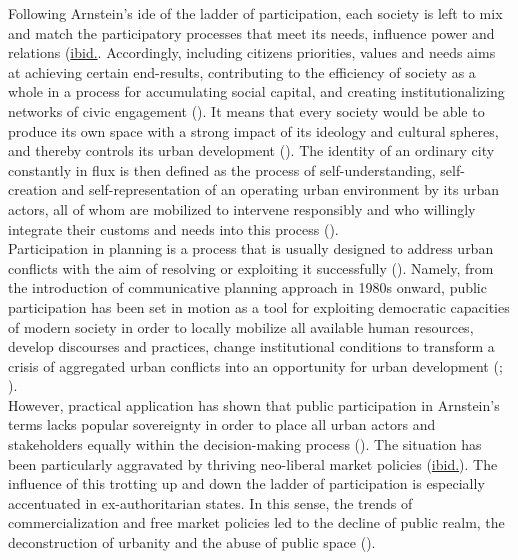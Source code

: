 \documentclass[11pt]{report}
\begin{document}
Following Arnstein’s ide of the ladder of participation, each society is left to mix and match the participatory processes that meet its needs, influence power and relations (\href{Fisher}{ibid.}.
Accordingly, including citizens priorities, values and needs aims at achieving certain end-results, contributing to the efficiency of society as a whole in a process for accumulating social capital, and creating institutionalizing networks of civic engagement (\href{Putnam}{\citealt{putnam_making_1993}}).
It means that every society would be able to produce its own space with a strong impact of its ideology and cultural spheres, and thereby controls its urban development (\href{Lefebvre}{\citealt{Lefebvre_Production_1974}}). 
The identity of an ordinary city constantly in flux is then defined as the process of self-understanding, self-creation and self-representation of an operating urban environment by its urban actors, all of whom are mobilized to intervene responsibly and who willingly integrate their customs and needs into this process
(\href{Bolay}{\citealt{bolay_urban_2004}}).
\\

Participation in planning is a process that is usually designed to address urban conflicts with the aim of resolving or exploiting it successfully (\href{Fisher}{\citealt{fisher_building_2001}}).
Namely, from the introduction of communicative planning approach in 1980s onward, public participation has been set in motion as a tool for exploiting democratic capacities of modern society in order to locally mobilize all available human resources, develop discourses and practices, change institutional conditions to transform a crisis of aggregated urban conflicts into an opportunity for urban development
(\href{Healey}{\citealt{healey_communicative_1996}}; \href{Scharpf}{\citealt{scharpf_XXX_1997}}).
\\

However, practical application has shown that public participation in Arnstein’s terms lacks popular sovereignty in order to place all urban actors and stakeholders equally within the decision-making process
(\href{Mouffe}{\citealt{mouffe_which_2002}}).
The situation has been particularly aggravated by thriving neo-liberal market policies (\href{Mouffe}{ibid.}).
The influence of this trotting up and down the ladder of participation is especially accentuated in ex-authoritarian states.
In this sense, the trends of commercialization and free market policies led to the decline of public realm, the deconstruction of urbanity and the abuse of public space
(\href{Hirt}{\citealt{hirt_landscapes_2008}}).
\\
\end{document}

